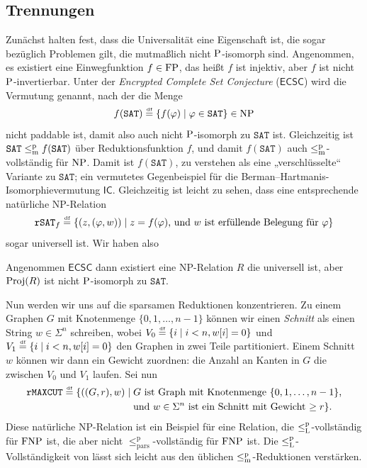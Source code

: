\subsection*{Trennungen}

Zunächst halten \textcite{agrawal_universal_1992} fest, dass die Universalität eine Eigenschaft ist, die sogar bezüglich Problemen gilt, die mutmaßlich nicht $\P$-isomorph sind.
Angenommen, es existiert eine Einwegfunktion $f\in\FP$, das heißt $f$ ist injektiv, aber $f$ ist nicht $\P$-invertierbar.
Unter der \emph{Encrypted Complete Set Conjecture} ($\mathsf{ECSC}$) wird die Vermutung genannt, nach der die Menge
\[ f(\mathtt{SAT}) \defeq \{ f(\phi) \mid \phi\in\mathtt{SAT} \}\in\NP \]
nicht paddable ist, damit also auch nicht $\P$-isomorph zu $\mathtt{SAT}$ ist.
Gleichzeitig ist $\mathtt{SAT}\leqmp f(\mathtt{SAT})$ über Reduktionsfunktion $f$, und damit $f(\mathtt{SAT})$ auch $\leqmp$-vollständig für $\NP$.
Damit ist $f(\mathtt{SAT})$, zu verstehen als eine „verschlüsselte“ Variante zu $\mathtt{SAT}$; ein vermutetes Gegenbeispiel für die Berman–Hartmanis-Isomorphievermutung $\mathsf{IC}$.
Gleichzeitig ist leicht zu sehen, dass eine entsprechende natürliche NP-Relation
\[ \mathtt{rSAT}_f \defeq \{ (z, (\phi, w)) \mid \text{$z=f(\phi)$, und $w$ ist erfüllende Belegung für $\phi$} \} \]
sogar universell ist.
Wir haben also %
\begin{observation}
    Angenommen $\mathsf{ECSC}$ dann existiert eine NP-Relation $R$ die universell ist, aber $\Proj(R)$ ist nicht $\P$-isomorph zu $\mathtt{SAT}$.
\end{observation}


Nun werden wir uns auf die sparsamen Reduktionen konzentrieren.
Zu einem Graphen $G$ mit Knotenmenge $\{0,1,\dots, n-1\}$ können wir einen \emph{Schnitt} als einen String $w\in\Sigma^n$ schreiben, wobei $V_0 \defeq \{ i \mid i<n, w[i]=0\}$ und $V_1 \defeq \{ i \mid i<n, w[i]=0\}$ den Graphen in zwei Teile partitioniert. Einem Schnitt $w$ können wir dann ein Gewicht zuordnen: die Anzahl an Kanten in $G$ die zwischen $V_0$ und $V_1$ laufen.
Sei nun
\[ \begin{split} \mathtt{rMAXCUT} \defeq \{ ((G, r), w) \mid {}&\text{$G$ ist Graph mit Knotenmenge $\{0,1,\dots,n-1\}$,} \\ &\text{und $w\in\Sigma^n$ ist ein Schnitt mit Gewicht $\geq r$} \}.\end{split} \]
Diese natürliche NP-Relation ist ein Beispiel für eine Relation, die $\leqlp$-vollständig für $\FNP$ ist, die aber nicht $\leq_\mathrm{pars}^\mathrm p$-vollständig für $\FNP$ ist. Die $\leqlp$-Vollständigkeit von lässt sich leicht aus den üblichen $\leqmp$-Reduktionen verstärken.

